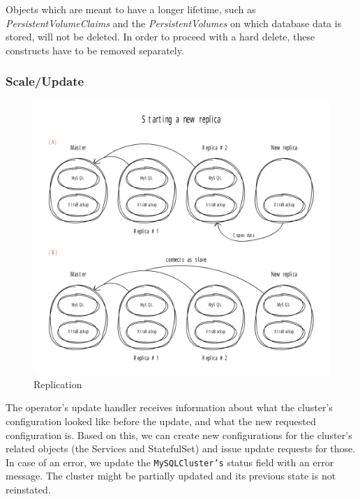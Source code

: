 Objects which are meant to have a longer lifetime, such as \textit{PersistentVolumeClaims} and the
\textit{PersistentVolumes} on which database data is stored, will not be deleted. In order to
proceed with a hard delete, these constructs have to be removed separately.

\subsubsection*{Scale/Update}
\begin{figure}[!ht]
    \centering
    \includegraphics[width=1\textwidth, angle=0]{img/replication.pdf}
    \caption{Replication}
    \label{fig:replication}
\end{figure}

The operator’s update handler receives information about what the cluster’s configuration looked
like before the update, and what the new requested configuration is. Based on this, we can create
new configurations for the cluster’s related objects (the Services and StatefulSet) and issue update
requests for those. In case of an error, we update the \texttt{MySQLCluster’s} status field with an error
message. The cluster might be partially updated and its previous state is not reinstated.

